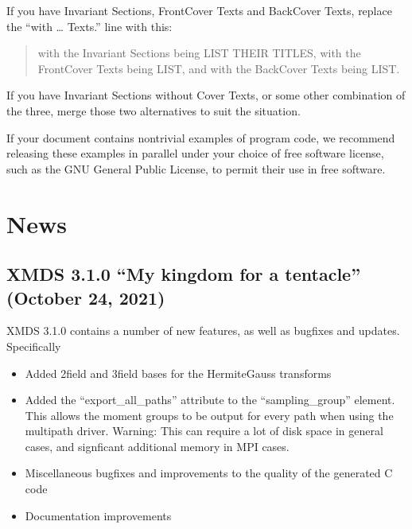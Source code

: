 \documentclass[letterpaper,10pt,english]{sphinxmanual}
\begin{document}
\sphinxAtStartPar
If you have Invariant Sections, Front\sphinxhyphen{}Cover Texts and Back\sphinxhyphen{}Cover Texts, replace the “with … Texts.” line with this:
\begin{quote}

\sphinxAtStartPar
with the Invariant Sections being LIST THEIR TITLES, with the
Front\sphinxhyphen{}Cover Texts being LIST, and with the Back\sphinxhyphen{}Cover Texts being LIST.
\end{quote}

\sphinxAtStartPar
If you have Invariant Sections without Cover Texts, or some other combination of the three, merge those two alternatives to suit the situation.

\sphinxAtStartPar
If your document contains nontrivial examples of program code, we recommend releasing these examples in parallel under your choice of free software license, such as the GNU General Public License, to permit their use in free software.

\ignorespaces 

\chapter{News}
\label{\detokenize{news:news}}\label{\detokenize{news:index-0}}\label{\detokenize{news:id1}}\label{\detokenize{news::doc}}

\section{XMDS 3.1.0 “My kingdom for a tentacle” (October 24, 2021)}
\label{\detokenize{news:xmds-3-1-0-my-kingdom-for-a-tentacle-october-24-2021}}
\sphinxAtStartPar
XMDS 3.1.0 contains a number of new features, as well as bugfixes and updates. Specifically
\begin{itemize}
\item {} 
\sphinxAtStartPar
Added 2\sphinxhyphen{}field and 3\sphinxhyphen{}field bases for the Hermite\sphinxhyphen{}Gauss transforms

\item {} 
\sphinxAtStartPar
Added the “export\_all\_paths” attribute to the “sampling\_group” element. This allows the moment groups to be output for every path when using the multipath driver. Warning: This can require a lot of disk space in general cases, and signficant additional memory in MPI cases.

\item {} 
\sphinxAtStartPar
Miscellaneous bugfixes and improvements to the quality of the generated C code

\item {} 
\sphinxAtStartPar
Documentation improvements

\end{itemize}
\end{document}
